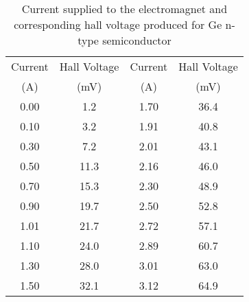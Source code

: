 \begin{table}[H]
    \centering
    \begin{tabular}{|c|c|c|c|}
    \hline
    Current & Hall Voltage & Current & Hall Voltage \\ 
    (A) & (mV) & (A) & (mV) \\ \hline
    0.00 & 1.2 & 1.70 & 36.4 \\ \hline
    0.10 & 3.2 & 1.91 & 40.8 \\ \hline
    0.30 & 7.2 & 2.01 & 43.1 \\ \hline
    0.50 & 11.3 & 2.16 & 46.0 \\ \hline
    0.70 & 15.3 & 2.30 & 48.9 \\ \hline
    0.90 & 19.7 & 2.50 & 52.8 \\ \hline
    1.01 & 21.7 & 2.72 & 57.1 \\ \hline
    1.10 & 24.0 & 2.89 & 60.7 \\ \hline
    1.30 & 28.0 & 3.01 & 63.0 \\ \hline
    1.50 & 32.1 & 3.12 & 64.9 \\ \hline
    \end{tabular}
    \caption{Current supplied to the electromagnet and
    corresponding hall voltage produced for Ge n-type
    semiconductor}
    \label{tab:geN}
    \end{table}
